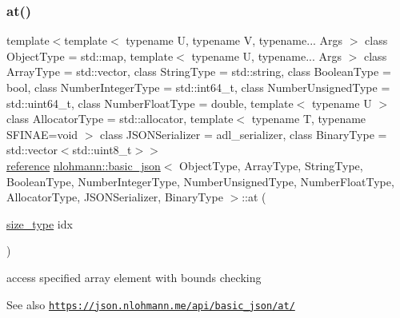\subsubsection{\texorpdfstring{at()}{at()}\hspace{0.1cm}{\footnotesize\ttfamily [1/6]}}
{\footnotesize\ttfamily template$<$template$<$ typename U, typename V, typename... Args $>$ class Object\+Type = std\+::map, template$<$ typename U, typename... Args $>$ class Array\+Type = std\+::vector, class String\+Type  = std\+::string, class Boolean\+Type  = bool, class Number\+Integer\+Type  = std\+::int64\+\_\+t, class Number\+Unsigned\+Type  = std\+::uint64\+\_\+t, class Number\+Float\+Type  = double, template$<$ typename U $>$ class Allocator\+Type = std\+::allocator, template$<$ typename T, typename S\+F\+I\+N\+A\+E=void $>$ class J\+S\+O\+N\+Serializer = adl\+\_\+serializer, class Binary\+Type  = std\+::vector$<$std\+::uint8\+\_\+t$>$$>$ \\
\hyperlink{classnlohmann_1_1basic__json_a220ae98554a76205fb7f8822d36b2d5a}{reference} \hyperlink{classnlohmann_1_1basic__json}{nlohmann\+::basic\+\_\+json}$<$ Object\+Type, Array\+Type, String\+Type, Boolean\+Type, Number\+Integer\+Type, Number\+Unsigned\+Type, Number\+Float\+Type, Allocator\+Type, J\+S\+O\+N\+Serializer, Binary\+Type $>$\+::at (\begin{DoxyParamCaption}\item[{\hyperlink{classnlohmann_1_1basic__json_a3ada29bca70b4965f6fd37ec1c8f85f7}{size\+\_\+type}}]{idx }\end{DoxyParamCaption})\hspace{0.3cm}{\ttfamily [inline]}}



access specified array element with bounds checking 

\begin{DoxySeeAlso}{See also}
\href{https://json.nlohmann.me/api/basic_json/at/}{\tt https\+://json.\+nlohmann.\+me/api/basic\+\_\+json/at/} 
\end{DoxySeeAlso}
\mbox{\label{classnlohmann_1_1basic__json_aeb18fe2b8a5dbff4ccf2848de854c3ac}} 
